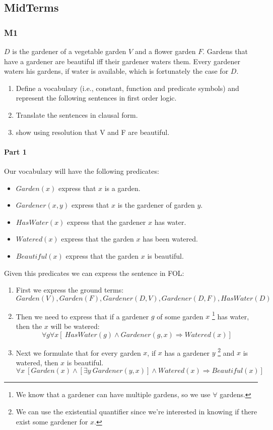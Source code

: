 \documentclass[10pt,a4paper]{article}
\begin{document}
\begin{itemize}
\vfill

\subsection{MidTerms}
\subsubsection{M1}


$D$ is the gardener of a vegetable garden $V$ and a flower garden $F$. Gardens that have a gardener are beautiful iff their gardener waters them. Every gardener waters his gardens, if water is available, which is fortunately the case for $D$.
\begin{enumerate}
\item  Define a vocabulary (i.e., constant, function and predicate symbols) and represent the following sentences in first order logic.
\item Translate the sentences in clausal form.
\item show using resolution that V and F are beautiful.
\end{enumerate}


\paragraph{Part 1}
Our vocabulary will have the following predicates:
\begin{itemize}
\item $Garden(x)$ express that $x$ is a garden.
\item $Gardener(x,y)$ express that $x$ is the gardener of garden $y$.
\item $HasWater(x)$ express that the gardener $x$ has water.
\item $Watered(x)$ express that the garden $x$ has been watered.
\item $Beautiful(x)$ express that the garden $x$ is beautiful.
\end{itemize}

Given this predicates we can express the sentence in FOL:
\begin{enumerate}
\item First we express the ground terms:
\[ Garden(V), Garden(F), Gardener(D,V), Gardener(D,F), HasWater(D)\]
\item Then we need to express that if a gardener $g$ of some garden $x$ \footnote{We know that a gardener can have multiple gardens, so we use $\forall$ gardens.} has water, then the $x$ will be watered:
\[\forall g \forall x[\ HasWater(g)\wedge Gardener(g,x)\Rightarrow Watered(x)]\]
\item Next we formulate that for every garden $x$, if $x$ has a gardener $y$ \footnote{We can use the existential quantifier since we're interested in knowing if there exist some gardener for $x$. } and $x$ is watered, then $x$ is beautiful.
\[\forall x\ [Garden(x)\wedge [\exists y\ Gardener(y,x)]\wedge Watered(x)\Rightarrow Beautiful(x)]\]
\end{enumerate}


\end{itemize}
\end{document}
